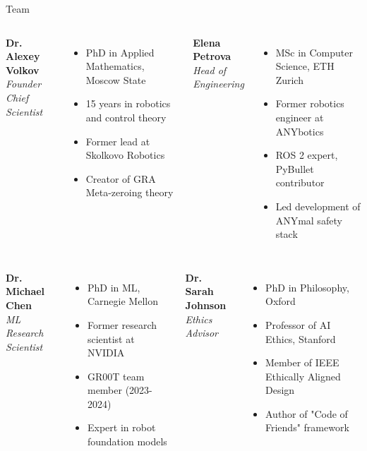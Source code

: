 \documentclass{beamer}
\begin{document}
\begin{frame}{Team}

\begin{columns}[t]
\centering
\textbf{Dr. Alexey Volkov}\\
\textit{Founder \/ Chief Scientist}\\
\begin{itemize}
    \item PhD in Applied Mathematics, Moscow State
    \item 15 years in robotics and control theory
    \item Former lead at Skolkovo Robotics
    \item Creator of GRA Meta-zeroing theory
\end{itemize}

\centering
\textbf{Elena Petrova}\\
\textit{Head of Engineering}\\
\begin{itemize}
    \item MSc in Computer Science, ETH Zurich
    \item Former robotics engineer at ANYbotics
    \item ROS 2 expert, PyBullet contributor
    \item Led development of ANYmal safety stack
\end{itemize}
\end{columns}

\vspace{0.5cm}
\begin{columns}[t]
\centering
\textbf{Dr. Michael Chen}\\
\textit{ML Research Scientist}\\
\begin{itemize}
    \item PhD in ML, Carnegie Mellon
    \item Former research scientist at NVIDIA
    \item GR00T team member (2023-2024)
    \item Expert in robot foundation models
\end{itemize}

\centering
\textbf{Dr. Sarah Johnson}\\
\textit{Ethics Advisor}\\
\begin{itemize}
    \item PhD in Philosophy, Oxford
    \item Professor of AI Ethics, Stanford
    \item Member of IEEE Ethically Aligned Design
    \item Author of "Code of Friends" framework
\end{itemize}
\end{columns}
\end{frame}
\end{document}
